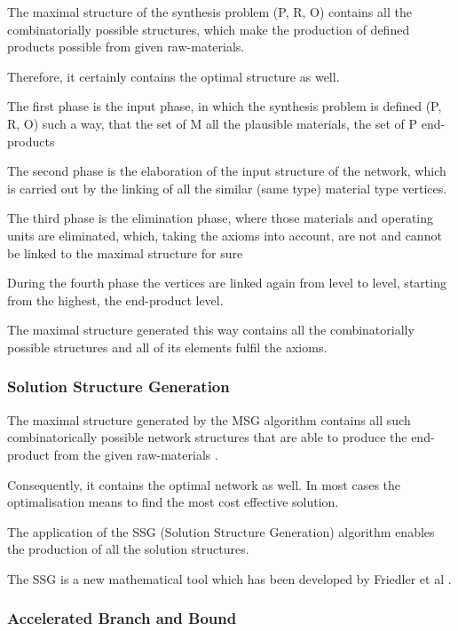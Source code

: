 The maximal structure of the synthesis problem (P, R, O) 
contains all the combinatorially possible structures,
which make the production of defined products possible 
from given raw-materials. \cite{pns2}\cite{algo}
 
Therefore, it certainly contains the optimal structure as well.

The first phase is the input phase, in which the synthesis problem 
is defined (P, R, O) such a way, that the set of M all the plausible materials, 
the set of P end-products 

The second phase is the elaboration of the input structure of the network, 
which is carried out by the linking of all the similar (same type) material type vertices.

The third phase is the elimination phase, where those materials 
and operating units are eliminated, which, taking the axioms into account,
are not and cannot be linked to the maximal structure for sure

During the fourth phase the vertices are linked again from level to level, 
starting from the highest, the end-product level.

The maximal structure generated this way contains all the combinatorially possible 
structures and all of its elements fulfil the axioms\cite{pns2, algo}.

\subsubsection{Solution Structure Generation}

The maximal structure generated by the MSG algorithm contains all such combinatorically 
possible network structures that are able to produce the end-product from the given raw-materials \cite{pns2 ,algo}.

Consequently, it contains the optimal network as well. 
In most cases the optimalisation means to find the most cost effective solution.

The application of the SSG (Solution Structure Generation) algorithm 
enables the production of all the solution structures. 

The SSG is a new mathematical tool which has been developed by Friedler et al \cite{pns2, algo}.

\subsubsection{Accelerated Branch and Bound}

